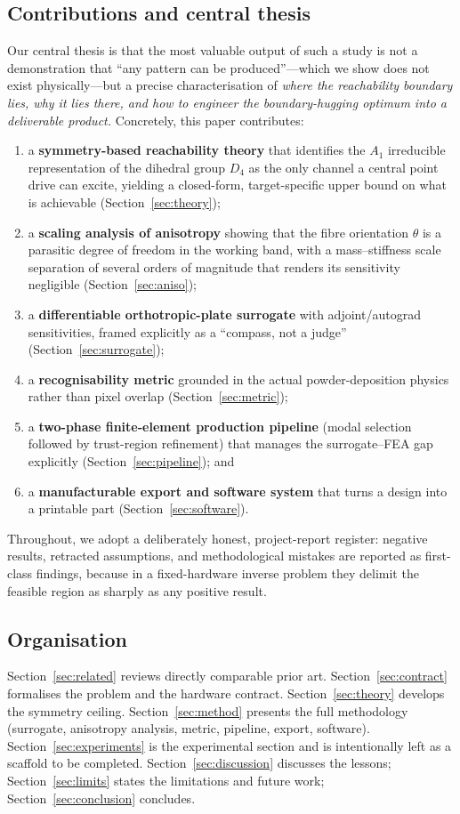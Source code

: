 \documentclass[11pt,a4paper]{article}
\newcommand{\Aone}{A_1}
\newcommand{\Dfour}{D_4}
\begin{document}
\subsection{Contributions and central thesis}
Our central thesis is that the most valuable output of such a study is not a
demonstration that ``any pattern can be produced''---which we show does not exist
physically---but a precise characterisation of \emph{where the reachability
boundary lies, why it lies there, and how to engineer the boundary-hugging
optimum into a deliverable product.} Concretely, this paper contributes:
\begin{enumerate}[label=(\arabic*)]
\item a \textbf{symmetry-based reachability theory} that identifies the $\Aone$
irreducible representation of the dihedral group $\Dfour$ as the only channel a
central point drive can excite, yielding a closed-form, target-specific upper
bound on what is achievable (Section~\ref{sec:theory});
\item a \textbf{scaling analysis of anisotropy} showing that the fibre
orientation $\theta$ is a parasitic degree of freedom in the working band, with a
mass--stiffness scale separation of several orders of magnitude that renders its
sensitivity negligible (Section~\ref{sec:aniso});
\item a \textbf{differentiable orthotropic-plate surrogate} with adjoint/autograd
sensitivities, framed explicitly as a ``compass, not a judge''
(Section~\ref{sec:surrogate});
\item a \textbf{recognisability metric} grounded in the actual powder-deposition
physics rather than pixel overlap (Section~\ref{sec:metric});
\item a \textbf{two-phase finite-element production pipeline} (modal selection
followed by trust-region refinement) that manages the surrogate--FEA gap
explicitly (Section~\ref{sec:pipeline}); and
\item a \textbf{manufacturable export and software system} that turns a design
into a printable part (Section~\ref{sec:software}).
\end{enumerate}
Throughout, we adopt a deliberately honest, project-report register: negative
results, retracted assumptions, and methodological mistakes are reported as
first-class findings, because in a fixed-hardware inverse problem they delimit the
feasible region as sharply as any positive result.

\subsection{Organisation}
Section~\ref{sec:related} reviews directly comparable prior art.
Section~\ref{sec:contract} formalises the problem and the hardware contract.
Section~\ref{sec:theory} develops the symmetry ceiling.
Section~\ref{sec:method} presents the full methodology (surrogate, anisotropy
analysis, metric, pipeline, export, software). Section~\ref{sec:experiments} is
the experimental section and is intentionally left as a scaffold to be completed.
Section~\ref{sec:discussion} discusses the lessons; Section~\ref{sec:limits}
states the limitations and future work; Section~\ref{sec:conclusion} concludes.
\end{document}
